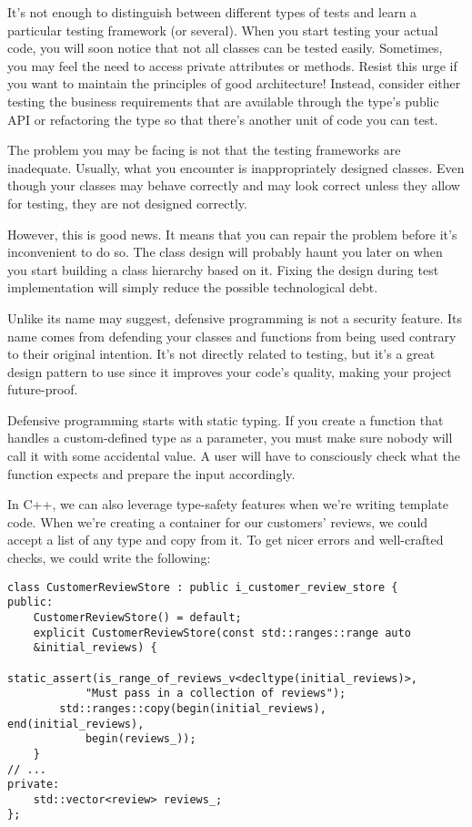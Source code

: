 
It's not enough to distinguish between different types of tests and learn a particular testing framework (or several). When you start testing your actual code, you will soon notice that not all classes can be tested easily. Sometimes, you may feel the need to access private attributes or methods. Resist this urge if you want to maintain the principles of good architecture! Instead, consider either testing the business requirements that are available through the type's public API or refactoring the type so that there's another unit of code you can test.


The problem you may be facing is not that the testing frameworks are inadequate. Usually, what you encounter is inappropriately designed classes. Even though your classes may behave correctly and may look correct unless they allow for testing, they are not designed correctly.

However, this is good news. It means that you can repair the problem before it's inconvenient to do so. The class design will probably haunt you later on when you start building a class hierarchy based on it. Fixing the design during test implementation will simply reduce the possible technological debt.


Unlike its name may suggest, defensive programming is not a security feature. Its name comes from defending your classes and functions from being used contrary to their original intention. It's not directly related to testing, but it's a great design pattern to use since it improves your code's quality, making your project future-proof.

Defensive programming starts with static typing. If you create a function that handles a custom-defined type as a parameter, you must make sure nobody will call it with some accidental value. A user will have to consciously check what the function expects and prepare the input accordingly.

In C++, we can also leverage type-safety features when we're writing template code. When we're creating a container for our customers' reviews, we could accept a list of any type and copy from it. To get nicer errors and well-crafted checks, we could write the following:

\begin{lstlisting}[style=styleCXX]
class CustomerReviewStore : public i_customer_review_store {
public:
	CustomerReviewStore() = default;
	explicit CustomerReviewStore(const std::ranges::range auto
	&initial_reviews) {
		static_assert(is_range_of_reviews_v<decltype(initial_reviews)>,
			"Must pass in a collection of reviews");
		std::ranges::copy(begin(initial_reviews), end(initial_reviews),
			begin(reviews_));
	}
// ...
private:
	std::vector<review> reviews_;
};
\end{lstlisting}

